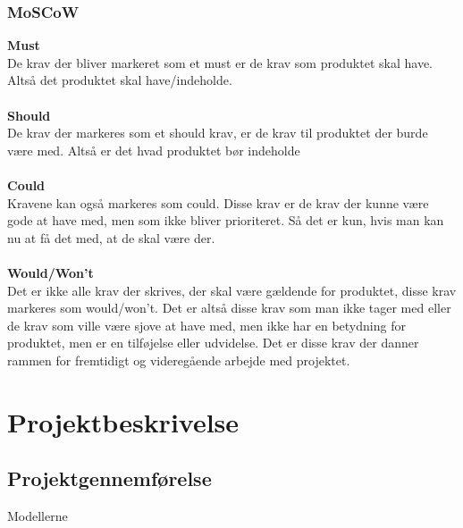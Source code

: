 \subsection{MoSCoW}
\textbf{Must}\\
De krav der bliver markeret som et must er de krav som produktet skal have. Altså det produktet skal have/indeholde.\\\\
\textbf{Should}\\
De krav der markeres som et should krav, er de krav til produktet der burde være med. Altså er det hvad produktet bør indeholde\\\\
\textbf{Could}\\
Kravene kan også markeres som could. Disse krav er de krav der kunne være gode at have med, men som ikke bliver prioriteret. Så det er kun, hvis man kan nu at få det med, at de skal være der.\\\\
\textbf{Would/Won't}\\
Det er ikke alle krav der skrives, der skal være gældende for produktet, disse krav markeres som would/won't. Det er altså disse krav som man ikke tager med eller de krav som ville være sjove at have med, men ikke har en betydning for produktet, men er en tilføjelse eller udvidelse. Det er disse krav der danner rammen for fremtidigt og videregående arbejde med projektet.
\chapter{Projektbeskrivelse}
\section{Projektgennemførelse}
Modellerne
